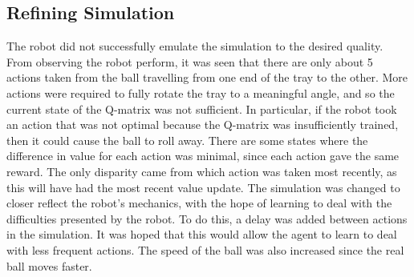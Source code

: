 \documentclass[12pt,a4paper]{article}
\begin{document}
\subsection{Refining Simulation}
The robot did not successfully emulate the simulation to the desired quality. From observing the robot perform, it was seen that there are only about 5 actions taken from the ball travelling from one end of the tray to the other. More actions were required to fully rotate the tray to a meaningful angle, and so the current state of the Q-matrix was not sufficient. In particular, if the robot took an action that was not optimal because the Q-matrix was insufficiently trained, then it could cause the ball to roll away. There are some states where the difference in value for each action was minimal, since each action gave the same reward. The only disparity came from which action was taken most recently, as this will have had the most recent value update. The simulation was changed to closer reflect the robot's mechanics, with the hope of learning to deal with the difficulties presented by the robot. To do this, a delay was added between actions in the simulation. It was hoped that this would allow the agent to learn to deal with less frequent actions. The speed of the ball was also increased since the real ball moves faster.


\end{document}
